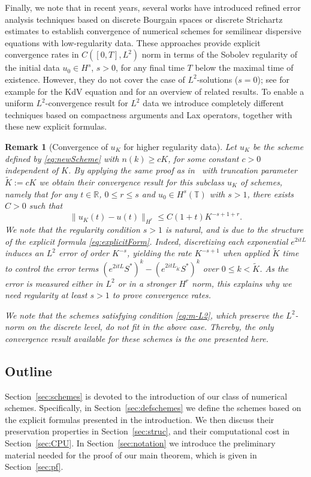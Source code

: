 \documentclass [11pt] {article}
\newtheorem{rem}[thm]{Remark}
\newcommand{\<}{\langle}
\renewcommand{\>}{\rangle}
\begin{document}
Finally, we note that in recent years, several works have introduced refined error analysis techniques based on discrete Bourgain spaces or discrete Strichartz estimates to establish convergence of numerical schemes for semilinear dispersive equations with low-regularity data. These approaches provide explicit convergence rates in \( C([0,T], L^2) \) norm in terms of the Sobolev regularity of the initial data $u_0 \in H^s$, $s>0$, for any final time $T$ below the maximal time of existence. However, they do not cover the case of \(L^2\)-solutions (\(s=0\)); see for example \cite{rousset-22} for the KdV equation and \cite[Chapter 1, Section 3]{AB-2025book} for an overview of related results. 
To enable a uniform $L^2$-convergence result for $L^2$ data we introduce completely different techniques based on compactness arguments and Lax operators, together with these new explicit formulas.

%

\begin{rem}[Convergence of $u_K$ for higher regularity data]\label{rem:cv-highreg}
Let $u_K$ be the scheme defined by \eqref{eq:newScheme} with $n(k) \ge cK$, for some constant $c>0$ independent of $K$. By applying the same proof as in~\cite{ABCD24} with truncation parameter $\tilde K := cK$ we obtain their convergence result for this subclass $u_K$ of schemes, namely that for any $t\in \mathbb{R}$, $0\le r\le s$ and $u_0 \in H^s(\mathbb{T})$ with $s>1$, there exists $C>0$ such that
\[
\|u_K(t) - u(t)\|_{H^r} \le C(1+t)K^{-s+1+r}.
\]
We note that the regularity condition $s>1$ is natural, and is due to the structure of the explicit formula \eqref{eq:explicitForm}. Indeed, discretizing each exponential $e^{2itL}$ 
induces an $L^2$ error of order $K^{-s}$, yielding the rate $K^{-s+1}$ when applied $\tilde K$ time to control the error terms $(e^{2itL}S^{*})^k - (e^{2itL_{\tilde K}}S^{*})^k$ over ${0\le k <\tilde K}$.
As the error is measured either in $L^2$ or in a stronger $H^r$ norm, this explains why we need regularity at least $s>1$ to prove convergence rates.

We note that the schemes satisfying condition \eqref{eq:m-L2}, which preserve the $L^2$-norm on the discrete level, do not fit in the above case. Thereby, the only convergence result available for these schemes is the one presented here.
\end{rem}
%

\subsection{Outline}
Section~\ref{sec:schemes} is devoted to the introduction of our class of numerical schemes. Specifically, in Section~\ref{sec:defschemes} we define the schemes based on the explicit formulas presented in the introduction. We then discuss their preservation properties in Section~\ref{sec:struc}, and their computational cost in Section~\ref{sec:CPU}. In Section~\ref{sec:notation} we introduce the preliminary material needed for the proof of our main theorem, which is given in Section~\ref{sec:pf}.
\end{document}
